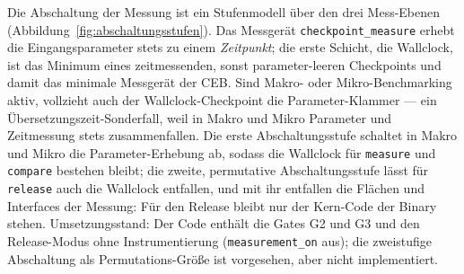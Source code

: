\begin{nurlang}
Die Abschaltung der Messung ist ein Stufenmodell über den drei Mess-Ebenen
(Abbildung~\ref{fig:abschaltungsstufen}). Das Messgerät \texttt{checkpoint\_measure} erhebt die
Eingangsparameter stets zu einem \emph{Zeitpunkt}; die erste Schicht, die Wallclock, ist das Minimum
eines zeitmessenden, sonst parameter-leeren Checkpoints und damit das minimale Messgerät der CEB\@. Sind
Makro- oder Mikro-Benchmarking aktiv, vollzieht auch der Wallclock-Checkpoint die Parameter-Klammer ---
ein Übersetzungszeit-Sonderfall, weil in Makro und Mikro Parameter und Zeitmessung stets zusammenfallen.
Die erste Abschaltungsstufe schaltet in Makro und Mikro die Parameter-Erhebung ab, sodass die Wallclock
für \texttt{measure} und \texttt{compare} bestehen bleibt; die zweite, permutative Abschaltungsstufe lässt
für \texttt{release} auch die Wallclock entfallen, und mit ihr entfallen die Flächen und Interfaces der
Messung: Für den Release bleibt nur der Kern-Code der Binary stehen. Umsetzungsstand: Der Code enthält
die Gates G2 und G3 und den Release-Modus ohne Instrumentierung (\texttt{measurement\_on} aus); die
zweistufige Abschaltung als Permutations-Größe ist vorgesehen, aber nicht implementiert.
\begin{figure}[htbp]\centering
\end{figure}
\end{nurlang}
